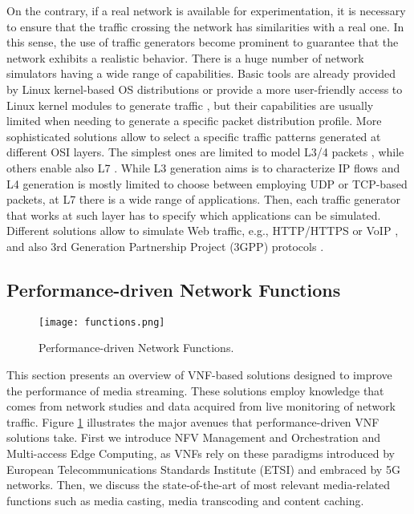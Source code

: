 On the contrary, if a real network is available for experimentation, it is necessary to ensure that the traffic crossing the network has similarities with a real one. In this sense, the use of traffic generators become prominent to guarantee that the network exhibits a realistic behavior. There is a huge number of network simulators having a wide range of capabilities. Basic tools are already provided by Linux kernel-based OS distributions \cite{iPerf, packETH} or provide a more user-friendly access to Linux kernel modules to generate traffic \cite{Olsson2005}, but their capabilities are usually limited when needing to generate a specific packet distribution profile.
More sophisticated solutions allow to select a specific traffic patterns generated at different OSI layers. The simplest ones are limited to model L3/4 packets \cite{Emmerich2015, Bonelli2005, Sommers2004}, while others enable also L7 \cite{Patil2017, TRex, Avallone2004, Botta2012, Seagull}. 
While L3 generation aims is to characterize IP flows and L4 generation is mostly limited to choose between employing UDP or TCP-based packets, at L7 there is a wide range of applications. Then, each traffic generator that works at such layer has to specify which applications can be simulated. Different solutions allow to simulate Web traffic, e.g., HTTP/HTTPS \cite{Patil2017, TRex} or VoIP \cite{Avallone2004, Botta2012}, and also 3rd Generation Partnership Project (3GPP) protocols \cite{Seagull}.

\subsection{Performance-driven Network Functions}
\label{sec:IEEECOMSTfunctions}

\begin{figure}[htp]
	\centering
	\texttt{[image: functions.png]}
	\caption{Performance-driven Network Functions.}
	\label{fig:IEEECOMSTnetfunctions}
	\vspace{-0.5cm}
\end{figure}

This section presents an overview of VNF-based solutions designed to improve the performance of media streaming. These solutions employ knowledge that comes from network studies and data acquired from live monitoring of network traffic. Figure \ref{fig:IEEECOMSTnetfunctions} illustrates the major avenues that performance-driven VNF solutions take. First we introduce NFV Management and Orchestration and Multi-access Edge Computing, as VNFs rely on these paradigms introduced by European Telecommunications Standards Institute (ETSI) and embraced by 5G networks. Then, we discuss the state-of-the-art of most relevant media-related functions such as media casting, media transcoding and content caching.

